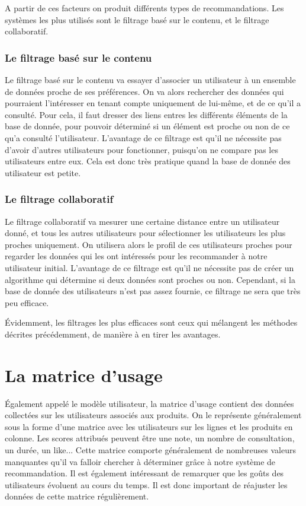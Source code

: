 \documentclass{report}
\begin{document}
A partir de ces facteurs on produit différents types de recommandations.
Les systèmes les plus utilisés sont le filtrage basé sur le contenu, et le filtrage collaboratif.

\subsubsection{Le filtrage basé sur le contenu}
Le filtrage basé sur le contenu va essayer d'associer un utilisateur à un ensemble de données proche de ses préférences. On va alors rechercher des données qui pourraient l'intéresser en tenant compte uniquement de lui-même, et de ce qu'il a consulté. Pour cela, il faut dresser des liens entres les différents éléments de la base de donnée, pour pouvoir déterminé si un élément est proche ou non de ce qu'a consulté l'utilisateur.
L'avantage de ce filtrage est qu'il ne nécessite pas d'avoir d'autres utilisateurs pour fonctionner, puisqu'on ne compare pas les utilisateurs entre eux. Cela est donc très pratique quand la base de donnée des utilisateur est petite.
\subsubsection{Le filtrage collaboratif}
Le filtrage collaboratif va mesurer une certaine distance entre un utilisateur donné, et tous les autres utilisateurs pour sélectionner les utilisateurs les plus proches uniquement.
On utilisera alors le profil de ces utilisateurs proches pour regarder les données qui les ont intéressés pour les recommander à notre utilisateur initial.
L'avantage de ce filtrage est qu'il ne nécessite pas de créer un algorithme qui détermine si deux données sont proches ou non. Cependant, si la base de donnée des utilisateurs n'est pas assez fournie, ce filtrage ne sera que très peu efficace.\par
Évidemment, les filtrages les plus efficaces sont ceux qui mélangent les méthodes décrites précédemment, de manière à en tirer les avantages.



\section{La matrice d'usage}
Également appelé le modèle utilisateur, la matrice d'usage contient des données collectées sur les utilisateurs associés aux produits. On le représente généralement sous la forme d'une matrice avec les utilisateurs sur les lignes et les produits en colonne. Les scores attribués peuvent être une note, un nombre de consultation, un durée, un like... Cette matrice comporte généralement de nombreuses valeurs manquantes qu'il va falloir chercher à déterminer grâce à notre système de recommandation.  Il est également intéressant de remarquer que les goûts des utilisateurs évoluent au cours du temps. Il est donc important de réajuster les données de cette matrice régulièrement.
\end{document}

